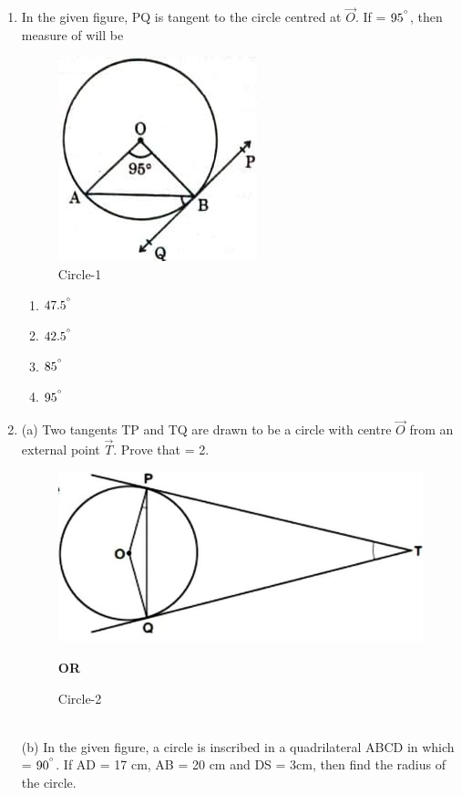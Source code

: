 \documentclass{article}
\begin{document}
\begin{enumerate}
	\item In the given figure, PQ is tangent to the circle centred at $ \vec{O} $. If  = $ 95^{\degree} $, then measure of  will be
	\begin{figure}[!h]
		\centering
		\includegraphics[scale=0.5]{1.jpg}
		\caption{Circle-1}
		\label{fig:circle}
	\end{figure}
		\begin{enumerate}
			\item $ 47.5^{\degree} $
			\item $ 42.5^{\degree} $
			\item $ 85^{\degree} $
			\item $ 95^{\degree} $
		\end{enumerate}
	\item (a) Two tangents TP and TQ are drawn to be a circle with centre $ \vec{O} $ from an external point $ \vec{T} $. Prove that  = 2.
		\begin{figure}[!h]
			\centering
			\includegraphics[scale=0.3]{2.jpg}
			\caption{Circle-2}
			\label{fig:circle}
			\textbf{OR}
		\end{figure}\\
	 (b) In the given figure, a circle is inscribed in a quadrilateral ABCD in which  = $ 90^{\degree} $. If AD = 17 cm, AB = 20 cm and DS = 3cm, then find the radius of the circle.

\end{enumerate}
\end{document}
